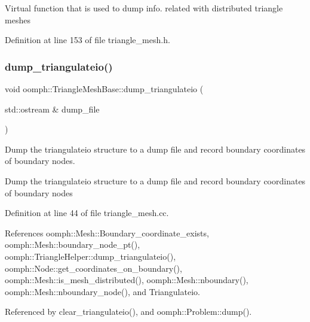 Virtual function that is used to dump info. related with distributed triangle meshes 

Definition at line 153 of file triangle\+\_\+mesh.\+h.

\mbox{\label{classoomph_1_1TriangleMeshBase_a3b27444232702a4bbbeb95aa9c963c07}} 
\subsubsection{\texorpdfstring{dump\+\_\+triangulateio()}{dump\_triangulateio()}}
{\footnotesize\ttfamily void oomph\+::\+Triangle\+Mesh\+Base\+::dump\+\_\+triangulateio (\begin{DoxyParamCaption}\item[{std\+::ostream \&}]{dump\+\_\+file }\end{DoxyParamCaption})}



Dump the triangulateio structure to a dump file and record boundary coordinates of boundary nodes. 

Dump the triangulateio structure to a dump file and record boundary coordinates of boundary nodes 

Definition at line 44 of file triangle\+\_\+mesh.\+cc.



References oomph\+::\+Mesh\+::\+Boundary\+\_\+coordinate\+\_\+exists, oomph\+::\+Mesh\+::boundary\+\_\+node\+\_\+pt(), oomph\+::\+Triangle\+Helper\+::dump\+\_\+triangulateio(), oomph\+::\+Node\+::get\+\_\+coordinates\+\_\+on\+\_\+boundary(), oomph\+::\+Mesh\+::is\+\_\+mesh\+\_\+distributed(), oomph\+::\+Mesh\+::nboundary(), oomph\+::\+Mesh\+::nboundary\+\_\+node(), and Triangulateio.



Referenced by clear\+\_\+triangulateio(), and oomph\+::\+Problem\+::dump().

\mbox{\label{classoomph_1_1TriangleMeshBase_ad3f02167046a1f96481b87dc48b09032}} 
